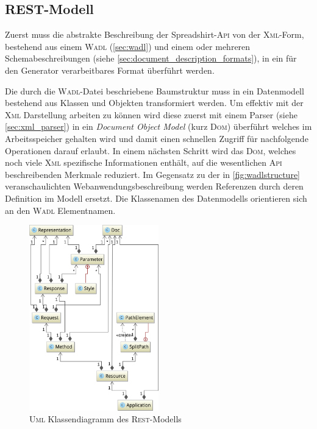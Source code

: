 \subsection{REST-Modell}
\label{sec:rest_model}

Zuerst muss die abstrakte Beschreibung der Spreadshirt-\textsc{Api} von der \textsc{Xml}-Form, bestehend aus einem \textsc{Wadl} (\cref{sec:wadl}) und einem oder mehreren Schemabeschreibungen (siehe \cref{sec:document_description_formats}), in ein für den Generator verarbeitbares Format überführt werden.

Die durch die \textsc{Wadl}-Datei beschriebene Baumstruktur muss in ein Datenmodell bestehend aus Klassen und Objekten transformiert werden.
Um effektiv mit der \textsc{Xml} Darstellung arbeiten zu können wird diese zuerst mit einem Parser (siehe \cref{sec:xml_parser}) in ein \emph{Document Object Model} (kurz \textsc{Dom}) überführt welches im Arbeitsspeicher gehalten wird und damit einen schnellen Zugriff für nachfolgende Operationen darauf erlaubt. In einem nächsten Schritt wird das \textsc{Dom}, welches noch viele \textsc{Xml} spezifische Informationen enthält, auf die wesentlichen \textsc{Api} beschreibenden Merkmale reduziert. Im Gegensatz zu der in \cref{fig:wadlstructure} veranschaulichten Webanwendungsbeschreibung werden Referenzen durch deren Definition im Modell ersetzt. Die Klassenamen des Datenmodells orientieren sich an den \textsc{Wadl} Elementnamen.

\begin{figure}[tb]
    \centering
    \includegraphics[width=0.5\textwidth]{resources/restmodel}
    \caption{\textsc{Uml} Klassendiagramm des \textsc{Rest}-Modells}
    \label{fig:restmodel}
\end{figure}

